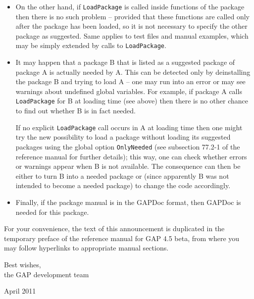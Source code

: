 \documentclass[10pt]{article}
\begin{document}
\begin{itemize}
\begin{itemize}
\item 
On the other hand, if {\tt LoadPackage} is called inside functions of the
package then there is no such problem -- provided that these functions are 
called only after the package has been loaded, so it is not necessary to
specify the other package as suggested. Same applies to test files
and manual examples, which may be simply extended by calls to {\tt LoadPackage}.

\item
It may happen that a package B that is listed as a suggested package
of package A is actually needed by A. This can be detected only
by deinstalling the package B and trying to load A -- one may run into an
error or may see warnings about undefined global variables.
For example, if package A calls {\tt LoadPackage} for B at loading time
(see above) then there is no other chance to find out whether B is in
fact needed.

If no explicit {\tt LoadPackage} call occurs in A at loading time then one
might try the new possibility to load a package without loading its
suggested packages using the global option {\tt OnlyNeeded} 
(see subsection 77.2-1 of the reference manual for further details); 
this way, one can check whether errors or warnings appear when B is not 
available. The consequence can then be either to turn B into a needed package 
or (since apparently B was not intended to become a needed package)
to change the code accordingly.

\item
Finally, if the package manual is in the GAPDoc format, 
then GAPDoc is needed for this package.
\end{itemize}

\end{itemize}

For your convenience, the text of this announcement is duplicated in the
temporary preface of the reference manual for GAP 4.5 beta, from where you 
may follow hyperlinks to appropriate manual sections.

Best wishes,\\
the GAP development team

April 2011
\end{document}
